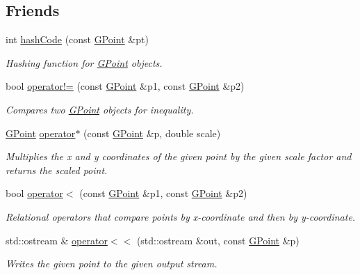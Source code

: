\subsection*{Friends}
\begin{DoxyCompactItemize}
\item 
int \mbox{\hyperlink{classGPoint_a1dead3b1190947a8b1f8dcb48eb918de}{hash\+Code}} (const \mbox{\hyperlink{classGPoint}{G\+Point}} \&pt)
\begin{DoxyCompactList}\small\item\em Hashing function for \mbox{\hyperlink{classGPoint}{G\+Point}} objects. \end{DoxyCompactList}\item 
bool \mbox{\hyperlink{classGPoint_add41464e7e2d69b7a90c72b16a7dbc6c}{operator!=}} (const \mbox{\hyperlink{classGPoint}{G\+Point}} \&p1, const \mbox{\hyperlink{classGPoint}{G\+Point}} \&p2)
\begin{DoxyCompactList}\small\item\em Compares two \mbox{\hyperlink{classGPoint}{G\+Point}} objects for inequality. \end{DoxyCompactList}\item 
\mbox{\hyperlink{classGPoint}{G\+Point}} \mbox{\hyperlink{classGPoint_a8646a3383f5abfedad724d1e5e6040ef}{operator$\ast$}} (const \mbox{\hyperlink{classGPoint}{G\+Point}} \&p, double scale)
\begin{DoxyCompactList}\small\item\em Multiplies the x and y coordinates of the given point by the given scale factor and returns the scaled point. \end{DoxyCompactList}\item 
bool \mbox{\hyperlink{classGPoint_a8ef7ca0053558918c5f7bcae257c1bec}{operator$<$}} (const \mbox{\hyperlink{classGPoint}{G\+Point}} \&p1, const \mbox{\hyperlink{classGPoint}{G\+Point}} \&p2)
\begin{DoxyCompactList}\small\item\em Relational operators that compare points by x-\/coordinate and then by y-\/coordinate. \end{DoxyCompactList}\item 
std\+::ostream \& \mbox{\hyperlink{classGPoint_aa8890c3cbec1c39bac51117875950b01}{operator$<$$<$}} (std\+::ostream \&out, const \mbox{\hyperlink{classGPoint}{G\+Point}} \&p)
\begin{DoxyCompactList}\small\item\em Writes the given point to the given output stream. \end{DoxyCompactList}\item 

\end{DoxyCompactItemize}
